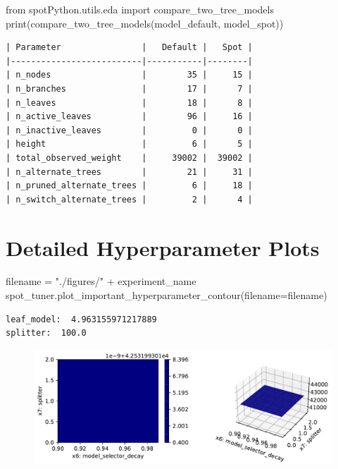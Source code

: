 \documentclass[
  letterpaper,
  DIV=11,
  numbers=noendperiod]{scrreprt}
\newenvironment{Shaded}{\begin{snugshade}}{\end{snugshade}}
\newcommand{\BuiltInTok}[1]{\textcolor[rgb]{0.00,0.23,0.31}{#1}}
\newcommand{\ImportTok}[1]{\textcolor[rgb]{0.00,0.46,0.62}{#1}}
\newcommand{\NormalTok}[1]{\textcolor[rgb]{0.00,0.23,0.31}{#1}}
\newcommand{\OperatorTok}[1]{\textcolor[rgb]{0.37,0.37,0.37}{#1}}
\newcommand{\StringTok}[1]{\textcolor[rgb]{0.13,0.47,0.30}{#1}}
\begin{document}
\begin{Shaded}
\begin{Highlighting}[]
\ImportTok{from}\NormalTok{ spotPython.utils.eda }\ImportTok{import}\NormalTok{ compare\_two\_tree\_models}
\BuiltInTok{print}\NormalTok{(compare\_two\_tree\_models(model\_default, model\_spot))}
\end{Highlighting}
\end{Shaded}

\begin{verbatim}
| Parameter                |   Default |   Spot |
|--------------------------|-----------|--------|
| n_nodes                  |        35 |     15 |
| n_branches               |        17 |      7 |
| n_leaves                 |        18 |      8 |
| n_active_leaves          |        96 |     16 |
| n_inactive_leaves        |         0 |      0 |
| height                   |         6 |      5 |
| total_observed_weight    |     39002 |  39002 |
| n_alternate_trees        |        21 |     31 |
| n_pruned_alternate_trees |         6 |     18 |
| n_switch_alternate_trees |         2 |      4 |
\end{verbatim}

\hypertarget{detailed-hyperparameter-plots-5}{%
\section{Detailed Hyperparameter
Plots}\label{detailed-hyperparameter-plots-5}}

\begin{Shaded}
\begin{Highlighting}[]
\NormalTok{filename }\OperatorTok{=} \StringTok{"./figures/"} \OperatorTok{+}\NormalTok{ experiment\_name}
\NormalTok{spot\_tuner.plot\_important\_hyperparameter\_contour(filename}\OperatorTok{=}\NormalTok{filename)}
\end{Highlighting}
\end{Shaded}

\begin{verbatim}
leaf_model:  4.963155971217889
splitter:  100.0
\end{verbatim}

\begin{figure}[H]

{\centering \includegraphics{024_spot_hpt_river_friedman_hatr_files/figure-pdf/cell-44-output-2.pdf}

}

\end{figure}
\end{document}
